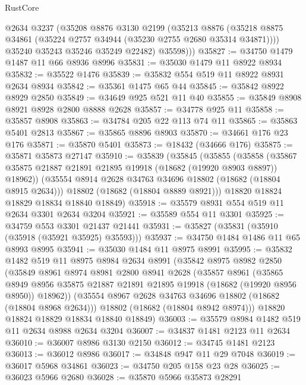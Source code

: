 \begin{lexlean}{RustCore}
\begin{coremodule}
          @2634
          @3237
          (@35208
            @8876
            @3130
            @2199
            (@35213
              @8876
              (@35218 @8875 @34861 (@35224 @2757 @34944 (@35230 @2755 @2680 @35314 @34871))))
            @35240
            @35243
            @35246
            @35249
            @22482)
          @35598)))
@35827 := @34750 @1479 @1487 @11 @66 @8936 @8996
@35831 := @35030 @1479 @11 @8922 @8934
@35832 := @35522 @1476
@35839 := @35832 @554 @519 @11 @8922 @8931 @2634 @8934
@35842 := @35361 @1475 @65 @44
@35845 := @35842 @8922 @8929 @2850
@35849 := @34649 @925 @521 @11 @40
@35855 := @35849 @8908 @8921 @8928 @2800 @8888 @2628
@35857 := @34778 @925 @11
@35858 := @35857 @8908
@35863 := @34784 @205 @22 @113 @74 @11
@35865 := @35863 @5401 @2813
@35867 := @35865 @8896 @8903
@35870 := @34661 @176 @23 @176
@35871 := @35870 @5401
@35873 := @18432 (@34666 @176)
@35875 := @35871 @35873 @27147
@35910 := @35839
    (@35845
      (@35855
        (@35858 (@35867 @35875 @21887 @21891 @21895 @19918 (@18682 (@19920 @8903 @8897)) @18962))
        (@35554 @8914 @2628 @34763 @34696 @18802 (@18682 (@18804 @8915 @2634)))
        @18802
        (@18682 (@18804 @8889 @8921)))
      @18820
      @18824
      @18829
      @18834
      @18840
      @18849)
@35918 := @35579 @8931 @554 @519 @11 @2634 @3301 @2634 @3204
@35921 := @35589 @554 @11 @3301
@35925 := @34759 @553 @3301 @21437 @21441
@35931 := @35827 (@35831 (@35910 (@35918 (@35921 @35925) @35593)))
@35937 := @34750 @1484 @1486 @11 @65 @8993 @8995
@35941 := @35030 @1484 @11 @8975 @8991
@35995 := @35832
    @1482
    @519
    @11
    @8975
    @8984
    @2634
    @8991
    (@35842
      @8975
      @8982
      @2850
      (@35849
        @8961
        @8974
        @8981
        @2800
        @8941
        @2628
        (@35857
          @8961
          (@35865
            @8949
            @8956
            @35875
            @21887
            @21891
            @21895
            @19918
            (@18682 (@19920 @8956 @8950))
            @18962))
        (@35554 @8967 @2628 @34763 @34696 @18802 (@18682 (@18804 @8968 @2634)))
        @18802
        (@18682 (@18804 @8942 @8974)))
      @18820
      @18824
      @18829
      @18834
      @18840
      @18849)
@36003 := @35579 @8984 @1482 @519 @11 @2634 @8988 @2634 @3204
@36007 := @34837 @1481 @2123 @11 @2634
@36010 := @36007 @8986 @3130 @2150
@36012 := @34745 @1481 @2123
@36013 := @36012 @8986
@36017 := @34848 @947 @11 @29 @7048
@36019 := @36017 @5968 @34861
@36023 := @34750 @205 @158 @23 @28
@36025 := @36023 @5966 @2680
@36028 := @35870 @5966 @35873 @28291

\end{coremodule}
\end{lexlean}
